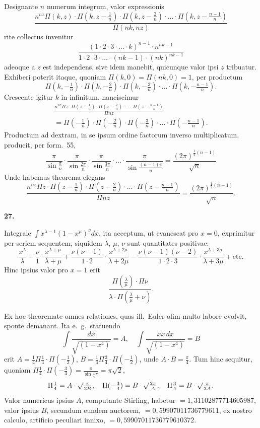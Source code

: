 \documentclass[12pt,a4paper]{article}
\newcommand{\art}[1]{\par\medskip\noindent\textbf{#1.}\par\nopagebreak\smallskip}
\begin{document}
Designante $n$ numerum integrum, valor expressionis
\[
\frac{n^{nz}\Pi(k,z)\cdot\Pi(k,z-\tfrac{1}{n})\cdot\Pi(k,z-\tfrac{2}{n})\cdot\ldots\cdot\Pi(k,z-\tfrac{n-1}{n})}{\Pi(nk,nz)}
\]
rite collectus invenitur
\[
\frac{(1\cdot2\cdot3\cdot\ldots\cdot k)^{n-1}\cdot n^{nk-1}}{1\cdot2\cdot3\cdot\ldots\cdot(nk-1)\cdot(nk)^{nk-1}}
\]
adeoque a $z$ est independens, sive idem manebit, quicunque valor ipsi $z$ tribuatur. Exhiberi poterit itaque, quoniam $\Pi(k,0)=\Pi(nk,0)=1$, per productum
\[
\Pi(k,-\tfrac{1}{n})\cdot\Pi(k,-\tfrac{2}{n})\cdot\Pi(k,-\tfrac{3}{n})\cdot\ldots\cdot\Pi(k,-\tfrac{n-1}{n}).
\]
Crescente igitur $k$ in infinitum, nanciscimur
\begin{multline}
\frac{n^{nz}\Pi z\cdot\Pi(z-\tfrac{1}{n})\cdot\Pi(z-\tfrac{2}{n})\cdot\ldots\cdot\Pi(z-\tfrac{n-1}{n})}{\Pi nz}\\
= \Pi(-\tfrac{1}{n})\cdot\Pi(-\tfrac{2}{n})\cdot\Pi(-\tfrac{3}{n})\cdot\ldots\cdot\Pi(-\tfrac{n-1}{n}).\tag{[57]}
\end{multline}
Productum ad dextram, in se ipsum ordine factorum inverso multiplicatum, producit, per form.\ 55,
\[
\frac{\pi}{\sin\tfrac{\pi}{n}}\cdot\frac{\pi}{\sin\tfrac{2\pi}{n}}\cdot\frac{\pi}{\sin\tfrac{3\pi}{n}}\cdot\ldots\cdot\frac{\pi}{\sin\tfrac{(n-1)\pi}{n}} = \frac{(2\pi)^{\frac{1}{2}(n-1)}}{\surd n}
\]
Unde habemus theorema elegans
\begin{equation}
\frac{n^{nz}\Pi z\cdot\Pi(z-\tfrac{1}{n})\cdot\Pi(z-\tfrac{2}{n})\cdot\ldots\cdot\Pi(z-\tfrac{n-1}{n})}{\Pi nz} = \frac{(2\pi)^{\frac{1}{2}(n-1)}}{\surd n}.\tag{[57]}
\end{equation}

\art{27}

Integrale $\int x^{\lambda-1}(1-x^\mu)^\nu dx$, ita acceptum, ut evanescat pro $x=0$, exprimitur per seriem sequentem, siquidem $\lambda$, $\mu$, $\nu$ sunt quantitates positivae:
\[
\frac{x^\lambda}{\lambda} - \frac{\nu}{1}\cdot\frac{x^{\lambda+\mu}}{\lambda+\mu} + \frac{\nu(\nu-1)}{1\cdot2}\cdot\frac{x^{\lambda+2\mu}}{\lambda+2\mu} - \frac{\nu(\nu-1)(\nu-2)}{1\cdot2\cdot3}\cdot\frac{x^{\lambda+3\mu}}{\lambda+3\mu} + \text{etc.}
\]
Hinc ipsius valor pro $x=1$ erit
\[
\frac{\Pi(\tfrac{\lambda}{\mu})\cdot\Pi\nu}{\lambda\cdot\Pi(\tfrac{\lambda}{\mu}+\nu)}.
\]

Ex hoc theoremate omnes relationes, quas ill.\ Euler olim multo labore evolvit, sponte demanant. Ita e.\ g.\ statuendo
\[
\int\!\frac{dx}{\sqrt{(1-x^4)}} = A,\quad \int\!\frac{xx\,dx}{\sqrt{(1-x^4)}} = B
\]
erit $A=\frac{1}{4}\Pi\frac{1}{4}\cdot\Pi(-\frac{1}{2})$, $B=\frac{1}{4}\Pi\frac{3}{4}\cdot\Pi(-\frac{1}{2})$, unde $A\cdot B=\frac{\pi}{4}$.
Tum hinc sequitur, quoniam $\Pi\frac{1}{4}\cdot\Pi(-\frac{3}{4})=\frac{\pi}{\sin\frac{1}{4}\pi}=\pi\surd2$,
\[
\Pi\tfrac{1}{4} = A\cdot\surd\tfrac{\pi}{2B},\quad \Pi(-\tfrac{3}{4}) = B\cdot\surd\tfrac{2\pi}{A},\quad \Pi\tfrac{3}{4} = B\cdot\surd\tfrac{\pi}{2A}.
\]
Valor numericus ipsius $A$, computante Stirling, habetur $=1{,}31102877714605987$, valor ipsius $B$, secundum eundem auctorem, $=0{,}59907011736779611$, ex nostro calculo, artificio peculiari innixo, $=0{,}59907011736779610372$.
\end{document}
